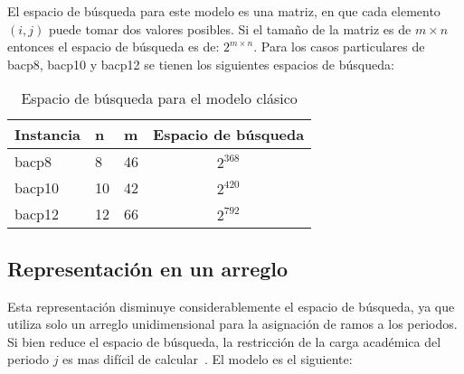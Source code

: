 \documentclass[letterpaper,10pt]{article}
\begin{document}
El espacio de búsqueda para este modelo es una matriz, en que cada elemento $(i,j)$ puede tomar dos valores posibles. Si el tamaño de la matriz es de $m \times n$ entonces el espacio de búsqueda es de: $2^{m\times n}$. Para los casos particulares de bacp8, bacp10 y bacp12 se tienen los siguientes espacios de búsqueda:

\begin{table}[H]
  \centering
  \begin{tabular}{@{}lllc@{}}
    \toprule[1pt]
    Instancia & n & m & Espacio de búsqueda\\
    \midrule
    bacp8 & 8 & 46 & $2^{368}$ \\
    bacp10 & 10 & 42 & $2^{420}$ \\
    bacp12 & 12 & 66 & $2^{792}$ \\
    \bottomrule
  \end{tabular}
  \caption{Espacio de búsqueda para el modelo clásico}
\end{table}

\subsection{Representación en un arreglo}

Esta representación disminuye considerablemente el espacio de búsqueda, ya que utiliza solo un arreglo unidimensional para la asignación de ramos a los periodos. Si bien reduce el espacio de búsqueda, la restricción de la carga académica del periodo $j$ es mas difícil de calcular~\cite{Hnich02modellinga}. El modelo es el siguiente:
\end{document}
